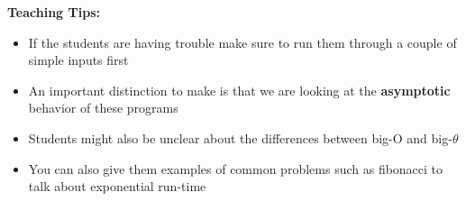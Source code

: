 \begin{guide}    
    \textbf{Teaching Tips:}
    \begin{itemize}
        \item If the students are having trouble make sure to run them through a couple of simple inputs first
        \item An important distinction to make is that we are looking at the \textbf{asymptotic} behavior of these programs
        \item Students might also be unclear about the differences between big-O and big-$\theta$
        \item You can also give them examples of common problems such as fibonacci to talk about exponential run-time
    \end{itemize}
\end{guide}
